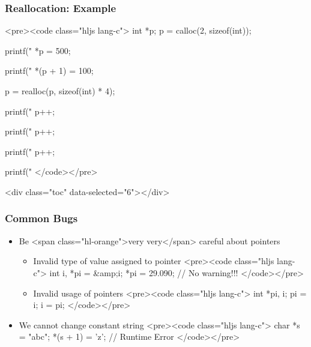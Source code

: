 \documentclass{../c-lecture}
\begin{document}
\begin{frame}
  \frametitle{Reallocation: Example}
  <pre><code class="hljs lang-c">
int *p;
p = calloc(2, sizeof(int));

printf("%
*p = 500;

printf("%
*(p + 1) = 100;

p = realloc(p, sizeof(int) * 4);

printf("%
p++;

printf("%
p++;

printf("%
p++;

printf("%
  </code></pre>
\end{frame}
\begin{frame}
  <div class="toc" data-selected="6"></div>
\end{frame}
\begin{frame}
  \begin{frame}
    \frametitle{Common Bugs}
    \begin{itemize}
      \item
        Be <span class="hl-orange">very very</span> careful about pointers

      \begin{itemize}
        \item Invalid type of value assigned to pointer
        <pre><code class="hljs lang-c">
int i, *pi = &amp;i;
*pi = 29.090; // No warning!!!
        </code></pre>
        \item Invalid usage of pointers
        <pre><code class="hljs lang-c">
int *pi, i;
pi = i;
i = pi;
        </code></pre>
      \end{itemize}
    \end{itemize}
  \end{frame}
  \begin{frame}
    \begin{itemize}
      \item We cannot change constant string
      <pre><code class="hljs lang-c">
char *s = "abc";
*(s + 1) = 'z'; // Runtime Error
      </code></pre>
    \end{itemize}
  \end{frame}
\end{frame}
\end{document}

